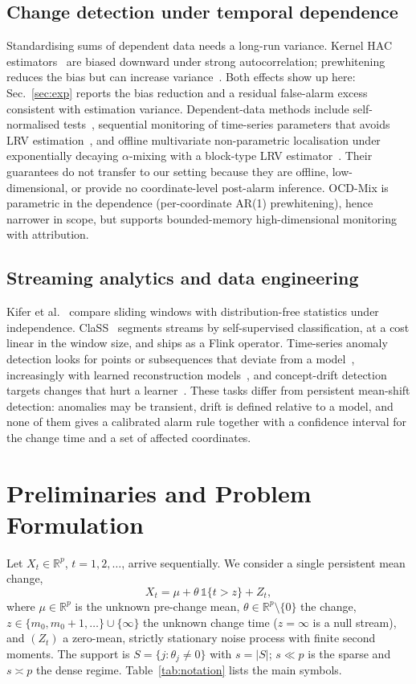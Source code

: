 \documentclass[conference]{IEEEtran}
\newcommand{\R}{\mathbb{R}}
\begin{document}
\subsection{Change detection under temporal dependence}
Standardising sums of dependent data needs a long-run variance. Kernel HAC estimators~\cite{newey1987,andrews1991} are biased downward under strong autocorrelation; prewhitening reduces the bias but can increase variance~\cite{andrews1992}. Both effects show up here: Sec.~\ref{sec:exp} reports the bias reduction and a residual false-alarm excess consistent with estimation variance. Dependent-data methods include self-normalised tests~\cite{shao2010}, sequential monitoring of time-series parameters that avoids LRV estimation~\cite{dette2020}, and offline multivariate non-parametric localisation under exponentially decaying $\alpha$-mixing with a block-type LRV estimator~\cite{padilla2023}. Their guarantees do not transfer to our setting because they are offline, low-dimensional, or provide no coordinate-level post-alarm inference. OCD-Mix is parametric in the dependence (per-coordinate AR(1) prewhitening), hence narrower in scope, but supports bounded-memory high-dimensional monitoring with attribution.

\subsection{Streaming analytics and data engineering}
Kifer et al.~\cite{kifer2004} compare sliding windows with distribution-free statistics under independence. ClaSS~\cite{ermshaus2024} segments streams by self-supervised classification, at a cost linear in the window size, and ships as a Flink operator. Time-series anomaly detection looks for points or subsequences that deviate from a model~\cite{schmidl2022}, increasingly with learned reconstruction models~\cite{tuli2022}, and concept-drift detection targets changes that hurt a learner~\cite{gama2014,lu2019}. These tasks differ from persistent mean-shift detection: anomalies may be transient, drift is defined relative to a model, and none of them gives a calibrated alarm rule together with a confidence interval for the change time and a set of affected coordinates.

\section{Preliminaries and Problem Formulation}
Let $X_t\in\R^p$, $t=1,2,\dots$, arrive sequentially. We consider a single persistent mean change,
\begin{equation}
X_t=\mu+\theta\,\mathbb{1}\{t>z\}+Z_t, \label{eq:model}
\end{equation}
where $\mu\in\R^p$ is the unknown pre-change mean, $\theta\in\R^p\setminus\{0\}$ the change, $z\in\{m_0,m_0+1,\dots\}\cup\{\infty\}$ the unknown change time ($z=\infty$ is a null stream), and $(Z_t)$ a zero-mean, strictly stationary noise process with finite second moments. The support is $S=\{j:\theta_j\neq 0\}$ with $s=|S|$; $s\ll p$ is the sparse and $s\asymp p$ the dense regime. Table~\ref{tab:notation} lists the main symbols.
\end{document}
